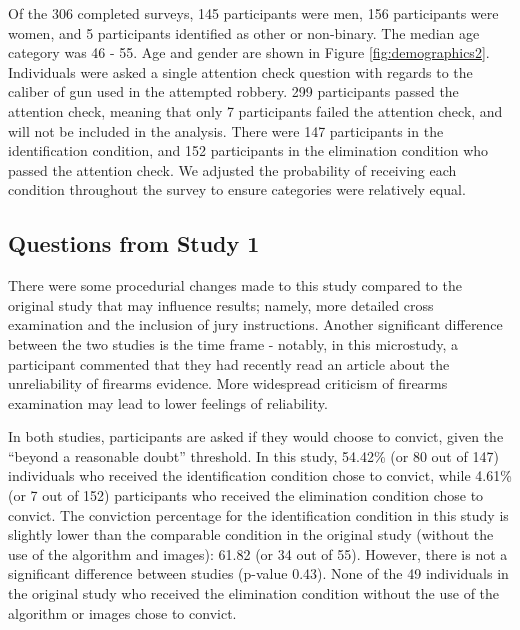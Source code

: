 \documentclass[print]{nuthesis}
\begin{document}
Of the 306 completed surveys, 145 participants were men, 156 participants were women, and 5 participants identified as other or non-binary.
The median age category was 46 - 55.
Age and gender are shown in Figure \ref{fig:demographics2}.
Individuals were asked a single attention check question with regards to the caliber of gun used in the attempted robbery.
299 participants passed the attention check, meaning that only 7 participants failed the attention check, and will not be included in the analysis.
There were 147 participants in the identification condition, and 152 participants in the elimination condition who passed the attention check.
We adjusted the probability of receiving each condition throughout the survey to ensure categories were relatively equal.

\hypertarget{questions-from-study-1}{%
\subsection{Questions from Study 1}\label{questions-from-study-1}}

There were some procedurial changes made to this study compared to the original study that may influence results; namely, more detailed cross examination and the inclusion of jury instructions.
Another significant difference between the two studies is the time frame - notably, in this microstudy, a participant commented that they had recently read an article about the unreliability of firearms evidence.
More widespread criticism of firearms examination may lead to lower feelings of reliability.

In both studies, participants are asked if they would choose to convict, given the ``beyond a reasonable doubt'' threshold.
In this study, 54.42\% (or 80 out of 147) individuals who received the identification condition chose to convict, while 4.61\% (or 7 out of 152) participants who received the elimination condition chose to convict.
The conviction percentage for the identification condition in this study is slightly lower than the comparable condition in the original study (without the use of the algorithm and images): 61.82 (or 34 out of 55).
However, there is not a significant difference between studies (p-value 0.43).
None of the 49 individuals in the original study who received the elimination condition without the use of the algorithm or images chose to convict.
\end{document}

